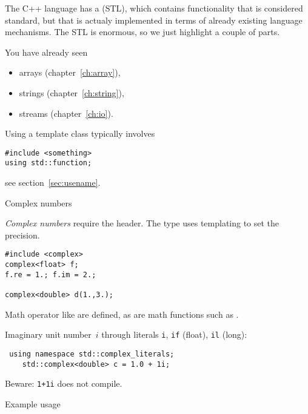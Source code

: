 
The C++ language has a  (STL),
which contains functionality that is considered standard, but that is
actualy implemented in terms of already existing language
mechanisms. The STL is enormous, so we just highlight a couple of
parts.

You have already seen
\begin{itemize}
\item
  arrays (chapter~\ref{ch:array}),
\item strings (chapter~\ref{ch:string}),
\item streams (chapter~\ref{ch:io}).
\end{itemize}

Using a template class typically involves
\begin{lstlisting}
#include <something>
using std::function;
\end{lstlisting}
see section~\ref{sec:usename}.

 {Complex numbers}
\label{sec:stl-complex}

\emph{Complex numbers}
require the  header.
The  type uses templating to set the precision.
\begin{lstlisting}
#include <complex>
complex<float> f;
f.re = 1.; f.im = 2.;

complex<double> d(1.,3.);
\end{lstlisting}
Math operator like \n{+,*} are defined, as are math functions
such as .

Imaginary unit number~$i$ through literals
\lstinline{i}, \lstinline{if} (float), \lstinline{il} (long):
\begin{lstlisting}
 using namespace std::complex_literals;
    std::complex<double> c = 1.0 + 1i;
\end{lstlisting}
Beware: \lstinline{1+1i} does not compile.

\begin{block}{Example usage}
  \label{sl:complexvec}
\end{block}

